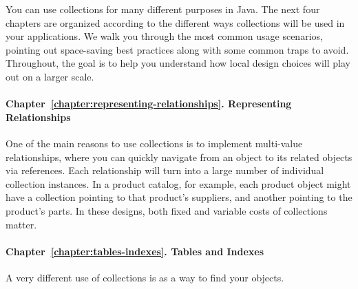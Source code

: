 You can use collections for many different purposes in Java.  The next four
chapters are organized according to the different ways collections will be used in your
applications. We walk you through the most common usage scenarios, pointing out
space-saving best practices along with some common traps to avoid. 
Throughout, the goal is to help you understand how local design choices
will play out on a larger scale.


\paragraph{Chapter~\ref{chapter:representing-relationships}. Representing
Relationships} One of the main reasons to use collections is to implement
multi-value relationships, where you can quickly navigate from an object
to its related objects via references. Each relationship will turn into a
large number of individual collection instances. In a product catalog, for example, each product object might have a collection
pointing to that product's suppliers, and another pointing to the product's
parts. In these designs, both fixed and variable costs of collections matter.

\paragraph{Chapter~\ref{chapter:tables-indexes}. Tables and Indexes} A very
different use of collections is as a way to find your objects. 

